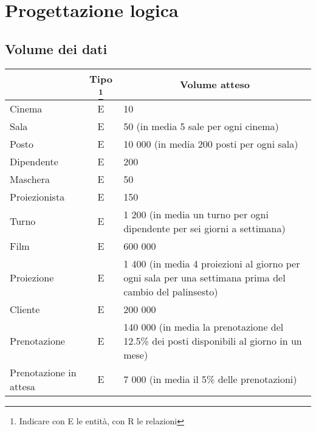 \section{Progettazione logica}

\subsection*{Volume dei dati}
%
%
\begin{tabularx}{\linewidth}{|l|c|X|}
    \hline
    \rowcolor{tblhdrcolor}
    \multicolumn{1}{|c|}{\textbf{Concetto nello schema}}
     & \multicolumn{1}{|c|}{\textbf{Tipo}
        \footnote{Indicare con E le entità, con R le relazioni}}
     & \multicolumn{1}{|c|}{\textbf{Volume atteso}}
    \\\hline
    Cinema
     & E
     & 10
    \\\hline
    Sala
     & E
     & 50 (in media 5 sale per ogni cinema)
    \\ \hline
    Posto
     & E
     & 10 000 (in media 200 posti per ogni sala)
    \\ \hline
    Dipendente
     & E
     & 200
    \\ \hline
    Maschera
     & E
     & 50
    \\ \hline
    Proiezionista
     & E
     & 150
    \\ \hline
    Turno
     & E
     & 1 200 (in media un turno per ogni dipendente per sei giorni a settimana)
    \\ \hline
    Film
     & E
     & 600 000
    \\ \hline
    Proiezione
     & E
     & 1 400 (in media 4 proiezioni al giorno per ogni sala per una settimana
    prima del cambio del palinsesto)
    \\ \hline
    Cliente
     & E
     & 200 000
    \\ \hline
    Prenotazione
     & E
     & 140 000 (in media la prenotazione del 12.5\% dei posti disponibili al
    giorno in un mese)
    \\ \hline
    Prenotazione in attesa
     & E
     & 7 000 (in media il 5\% delle prenotazioni)
    \\ \hline

\end{tabularx}
